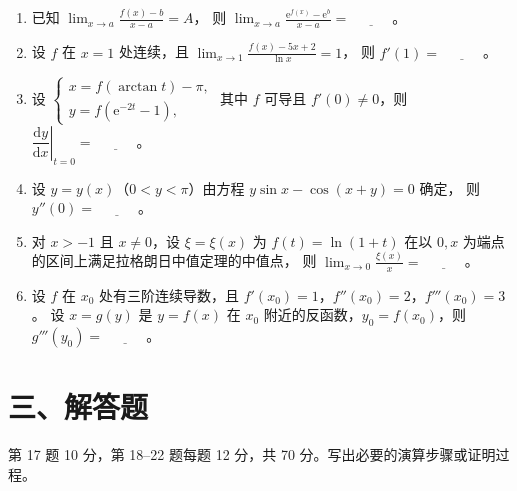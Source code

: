 \documentclass[UTF8,a4paper,zihao=-4,fontset=fandol]{ctexart}
\newcommand{\blank}{\underline{\hspace{3em}}}
\begin{document}
\begin{enumerate}[start=11,itemsep=0.6em]
  \item 已知 $\displaystyle\lim_{x\to a}\frac{f(x)-b}{x-a}=A$，
  则 $\displaystyle\lim_{x\to a}\frac{\mathrm{e}^{f(x)}-\mathrm{e}^{b}}{x-a}=\blank$。

  \item 设 $f$ 在 $x=1$ 处连续，且 $\displaystyle\lim_{x\to1}\frac{f(x)-5x+2}{\ln x}=1$，
  则 $f'(1)=\blank$。

  \item 设
  $\begin{cases}
    x=f(\arctan t)-\pi,\\
    y=f(\mathrm{e}^{-2t}-1),
  \end{cases}$
  其中 $f$ 可导且 $f'(0)\ne0$，则 $\left.\dfrac{\mathrm{d}y}{\mathrm{d}x}\right|_{t=0}=\blank$。

  \item 设 $y=y(x)$（$0<y<\pi$）由方程 $y\sin x-\cos(x+y)=0$ 确定，
  则 $y''(0)=\blank$。

  \item 对 $x>-1$ 且 $x\ne0$，设 $\xi=\xi(x)$ 为 $f(t)=\ln(1+t)$
  在以 $0,x$ 为端点的区间上满足拉格朗日中值定理的中值点，
  则 $\displaystyle\lim_{x\to0}\frac{\xi(x)}{x}=\blank$。

  \item 设 $f$ 在 $x_0$ 处有三阶连续导数，且
  $f'(x_0)=1$，$f''(x_0)=2$，$f'''(x_0)=3$。
  设 $x=g(y)$ 是 $y=f(x)$ 在 $x_0$ 附近的反函数，$y_0=f(x_0)$，则 $g'''(y_0)=\blank$。
\end{enumerate}

\newpage
\section*{三、解答题}
第 17 题 10 分，第 18--22 题每题 12 分，共 70 分。写出必要的演算步骤或证明过程。
\end{document}

